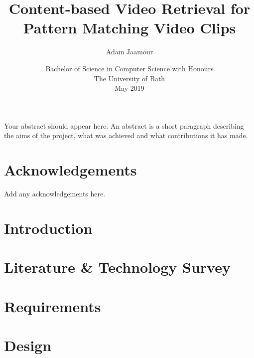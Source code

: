 \documentclass[11pt,openright,twoside,a4paper]{report}
\title{Content-based Video Retrieval for Pattern Matching Video Clips}
\author{Adam Jaamour}
\date{Bachelor of Science in Computer Science with Honours\\The University of Bath\\May 2019}
\begin{document}
\setcounter{page}{0}

\maketitle
\newpage

\newpage

\newpage

\abstract
Your abstract should appear here.  An abstract is a short
paragraph describing the aims of the project, what was
achieved and what contributions it has made.
\newpage

\setcounter{tocdepth}{3}
\tableofcontents
\newpage
\listoffigures
\newpage
\listoftables
\newpage

\chapter*{Acknowledgements}
Add any acknowledgements here.
\newpage

\setcounter{page}{1}

\chapter{Introduction}
\label{ch:chapter1}


\chapter{Literature \& Technology Survey}
\label{ch:chapter2}


\chapter{Requirements}
\label{ch:chapter3}


\chapter{Design}
\label{ch:chapter4}

\end{document}
